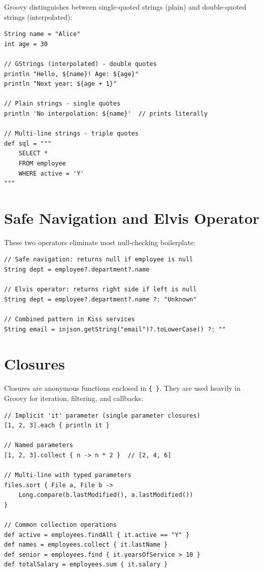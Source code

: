 Groovy distinguishes between single-quoted strings (plain) and double-quoted strings (interpolated):

\begin{lstlisting}[style=groovy]
String name = "Alice"
int age = 30

// GStrings (interpolated) - double quotes
println "Hello, ${name}! Age: ${age}"
println "Next year: ${age + 1}"

// Plain strings - single quotes
println 'No interpolation: ${name}'  // prints literally

// Multi-line strings - triple quotes
def sql = """
    SELECT *
    FROM employee
    WHERE active = 'Y'
"""
\end{lstlisting}

\section{Safe Navigation and Elvis Operator}
\label{sec:groovy-safe}

These two operators eliminate most null-checking boilerplate:

\begin{lstlisting}[style=groovy]
// Safe navigation: returns null if employee is null
String dept = employee?.department?.name

// Elvis operator: returns right side if left is null
String dept = employee?.department?.name ?: "Unknown"

// Combined pattern in Kiss services
String email = injson.getString("email")?.toLowerCase() ?: ""
\end{lstlisting}

\section{Closures}
\label{sec:groovy-closures}

Closures are anonymous functions enclosed in \texttt{\{ \}}.  They are used heavily in Groovy for iteration, filtering, and callbacks:

\begin{lstlisting}[style=groovy]
// Implicit 'it' parameter (single parameter closures)
[1, 2, 3].each { println it }

// Named parameters
[1, 2, 3].collect { n -> n * 2 }  // [2, 4, 6]

// Multi-line with typed parameters
files.sort { File a, File b ->
    Long.compare(b.lastModified(), a.lastModified())
}

// Common collection operations
def active = employees.findAll { it.active == "Y" }
def names = employees.collect { it.lastName }
def senior = employees.find { it.yearsOfService > 10 }
def totalSalary = employees.sum { it.salary }
\end{lstlisting}

